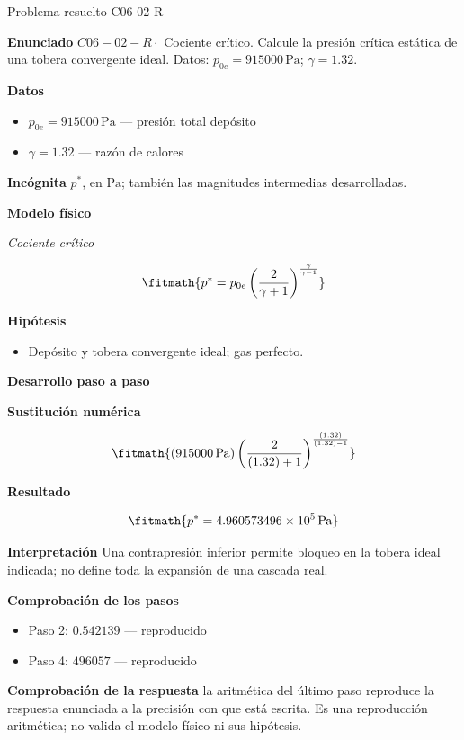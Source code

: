 \documentclass[10pt,openany]{book}
\begin{document}
\begin{studiumworked}{Problema resuelto C06-02-R}


\noindent\textbf{Enunciado}
\(C06-02-R \cdot\) Cociente crítico. Calcule la presión crítica estática de una tobera convergente ideal. Datos: \(p_{0e}=915000\, \mathrm{Pa}\); \(\gamma=1.32\).

\noindent\textbf{Datos}
\begin{itemize}
\item $p_{0e} = 915000\,\mathrm{Pa}$ — presión total depósito
\item $\gamma = 1.32$ — razón de calores
\end{itemize}

\noindent\textbf{Incógnita}
$p^{*}$, en $\mathrm{Pa}$; también las magnitudes intermedias desarrolladas.

\noindent\textbf{Modelo físico}

\noindent\textit{Cociente crítico}

\[
\fitmath{p^{*}=p_{0e} \left(\frac{2}{\gamma + 1}\right)^{\frac{\gamma}{\gamma - 1}}}
\]

\noindent\textbf{Hipótesis}
\begin{itemize}
\item Depósito y tobera convergente ideal; gas perfecto.
\end{itemize}

\noindent\textbf{Desarrollo paso a paso}



\noindent\textbf{Sustitución numérica}

\[
\fitmath{\left(915000\,\mathrm{Pa}\right) \left(\frac{2}{\left(1.32\right) + 1}\right)^{\frac{\left(1.32\right)}{\left(1.32\right) - 1}}}
\]

\noindent\textbf{Resultado}

\[
\fitmath{p^{*}=4.960573496\times10^{5}\,\mathrm{Pa}}
\]

\noindent\textbf{Interpretación}
Una contrapresión inferior permite bloqueo en la tobera ideal indicada; no define toda la expansión de una cascada real.

\noindent\textbf{Comprobación de los pasos}
\begin{itemize}
\item Paso 2: $0.542139$ — reproducido
\item Paso 4: $496057$ — reproducido
\end{itemize}

\noindent\textbf{Comprobación de la respuesta} la aritmética del último paso reproduce la respuesta enunciada a la precisión con que está escrita. Es una reproducción aritmética; no valida el modelo físico ni sus hipótesis.


\end{studiumworked}
\end{document}
